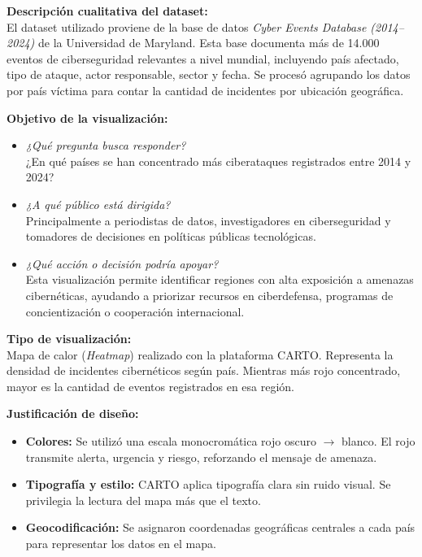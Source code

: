 \documentclass[12pt, a4paper]{article}
\begin{document}
\textbf{Descripción cualitativa del dataset:} \\
El dataset utilizado proviene de la base de datos \textit{Cyber Events Database (2014–2024)} de la Universidad de Maryland. Esta base documenta más de 14.000 eventos de ciberseguridad relevantes a nivel mundial, incluyendo país afectado, tipo de ataque, actor responsable, sector y fecha. Se procesó agrupando los datos por país víctima para contar la cantidad de incidentes por ubicación geográfica.

\vspace{0.5em}
\textbf{Objetivo de la visualización:} \\
\begin{itemize}
    \item \textit{¿Qué pregunta busca responder?} \\
    ¿En qué países se han concentrado más ciberataques registrados entre 2014 y 2024?
    
    \item \textit{¿A qué público está dirigida?} \\
    Principalmente a periodistas de datos, investigadores en ciberseguridad y tomadores de decisiones en políticas públicas tecnológicas.

    \item \textit{¿Qué acción o decisión podría apoyar?} \\
    Esta visualización permite identificar regiones con alta exposición a amenazas cibernéticas, ayudando a priorizar recursos en ciberdefensa, programas de concientización o cooperación internacional.
\end{itemize}

\vspace{0.5em}
\textbf{Tipo de visualización:} \\
Mapa de calor (\textit{Heatmap}) realizado con la plataforma CARTO. Representa la densidad de incidentes cibernéticos según país. Mientras más rojo concentrado, mayor es la cantidad de eventos registrados en esa región.

\vspace{0.5em}
\textbf{Justificación de diseño:} \\
\begin{itemize}
    \item \textbf{Colores:} Se utilizó una escala monocromática rojo oscuro $\rightarrow$ blanco. El rojo transmite alerta, urgencia y riesgo, reforzando el mensaje de amenaza.
    \item \textbf{Tipografía y estilo:} CARTO aplica tipografía clara sin ruido visual. Se privilegia la lectura del mapa más que el texto.
    \item \textbf{Geocodificación:} Se asignaron coordenadas geográficas centrales a cada país para representar los datos en el mapa.
\end{itemize}
\end{document}
